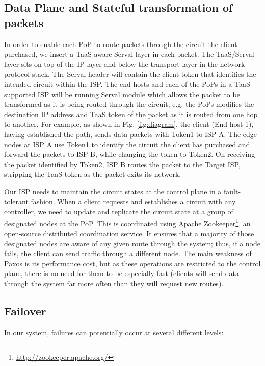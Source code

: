 \documentclass{article}
\begin{document}
\subsection{Data Plane and Stateful transformation of packets}

In order to enable each PoP to route packets through the circuit the
client purchased, we insert a TaaS-aware Serval layer in each
packet. The TaaS/Serval layer sits on top of the IP layer and below
the transport layer in the network protocol stack. The Serval header
will contain the client token that identifies the intended circuit
within the ISP. The end-hosts and each of the PoPs in a TaaS-supported
ISP will be running Serval module which allows the packet to be
transformed as it is being routed through the circuit, e.g. the PoPs
modifies the destination IP address and TaaS token of the packet as it
is routed from one hop to another. For example, as shown in Fig. \ref{fig:diagram},
 the client (End-host 1), having established the path,
 sends data packets with Token1 to ISP A. The edge nodes at
ISP A use Token1 to identify the circuit the client has purchased and
forward the packets to ISP B, while changing the token to Token2. On
receiving the packet identified by Token2, ISP B routes the packet to
the Target ISP, stripping the TaaS token as the packet exits its
network.

Our ISP needs to maintain the circuit states at the control plane in a
fault-tolerant fashion. When a client requests and establishes a
circuit with any controller, we need to update and replicate the
circuit state at a group of designated nodes at the PoP. This is
coordinated using Apache
Zookeeper\footnote{\url{http://zookeeper.apache.org/}}, an open-source
distributed coordination service. It ensures that a majority of those
designated nodes are aware of any given route through the system;
thus, if a node fails, the client can send traffic through a different
node. The main weakness of Paxos is its performance cost, but as these
operations are restricted to the control plane, there is no need for
them to be especially fast (clients will send data through the system
far more often than they will request new routes).

\subsection{Failover}

In our system, failures can potentially occur at several different
levels:
\end{document}
